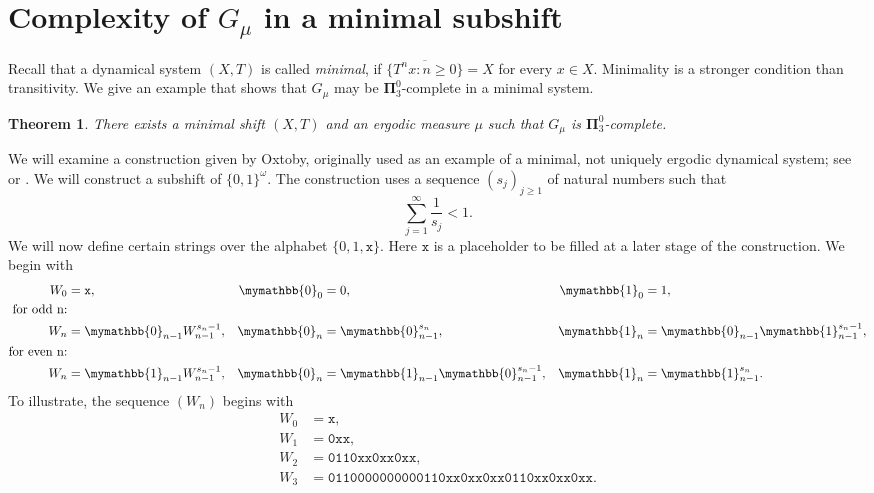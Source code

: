 \documentclass{amsart}
\newtheorem{thm}{Theorem}
\theoremstyle{definition}
\newcommand{\bP}{\boldsymbol{\Pi}}
\begin{document}
\section{Complexity of $G_{\mu}$ in a minimal subshift} \label{sec:minimalsubshift}
\newcommand{\one}{\mymathbb{1}}
\newcommand{\zero}{\mymathbb{0}}
\newcommand{\x}{\mathtt{x}}
\newcommand{\suf}{\sqsubseteq}

Recall that a dynamical system $(X, T)$ is called \emph{minimal}, if $\overline{ \{T^n x \colon n \ge 0 \} } = X$ for
every $x \in X$. Minimality is a stronger condition than transitivity. We give an example that shows that $G_\mu$ may be $\bP_3^0$-complete in a minimal system.

\begin{thm} \label{thm:minimal_pi03}
  There exists a minimal shift $(X, T)$ and an ergodic measure $\mu$ such that $G_\mu$ is $\bP_3^0$-complete.
\end{thm}
We will examine a construction given by Oxtoby, originally used as an example of a minimal, not uniquely ergodic dynamical system; see \cite[Example 10.3]{Downarowicz} or \cite[§10]{Oxtoby}.
We will construct a subshift of $\{0, 1\}^\omega$.  The construction uses a sequence $(s_j)_{j \geq 1}$ of natural numbers such that
\begin{equation} \label{eqn:s_j_condition}
  \sum_{j=1}^{\infty} \frac{1}{s_j} < 1.
\end{equation}
We will now define certain strings over the alphabet $\{0, 1, \x\}$.
Here $\x$ is a placeholder to be filled at a later stage of the construction.
We begin with
\begin{subequations} \label{eqn:recurrence_def}
	\begin{align}
		W_0 &= \x,
		& \zero_0 &= 0,
		& \one_0 &= 1, \\
		\nonumber
		\textrm{for odd n:}\\
		W_n &= \zero_{n-1}W_{n-1}^{s_n - 1},
		& \zero_n &= \zero_{n-1}^{s_n},
		& \one_n &= \zero_{n-1}\one_{n-1}^{s_n - 1}, \\
		\nonumber
		\textrm{for even n:}\\
		W_n &= \one_{n-1}W_{n-1}^{s_n - 1},
		& \zero_n &= \one_{n-1}\zero_{n-1}^{s_n - 1},
		& \one_n &= \one_{n-1}^{s_n}.
	\end{align}
\end{subequations}
To illustrate, the sequence $(W_n)$ begins with
\begin{align*}
	W_0 &= \mathtt{x}, \\
	W_1 &= \mathtt{0 x x}, \\
	W_2 &= \mathtt{0 1 1 0 x x 0 x x 0 x x}, \\
	W_3 &= \mathtt{0 1 1 0 0 0 0 0 0 0 0 0 0 1 1 0 x x 0 x x 0 x x 0 1 1 0 x x 0 x x 0 x x}.
\end{align*}
\end{document}
